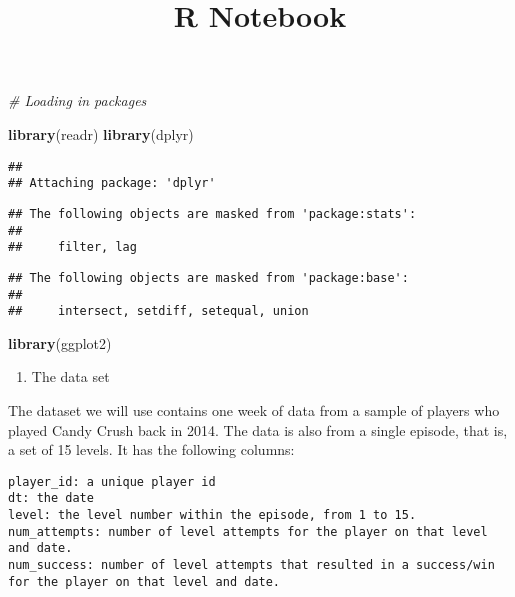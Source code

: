 \documentclass[
]{article}
\title{R Notebook}
\author{}
\date{\vspace{-2.5em}}
\newenvironment{Shaded}{\begin{snugshade}}{\end{snugshade}}
\newcommand{\CommentTok}[1]{\textcolor[rgb]{0.56,0.35,0.01}{\textit{#1}}}
\newcommand{\FunctionTok}[1]{\textcolor[rgb]{0.13,0.29,0.53}{\textbf{#1}}}
\newcommand{\NormalTok}[1]{#1}
\providecommand{\tightlist}{%
  \setlength{\itemsep}{0pt}\setlength{\parskip}{0pt}}
\begin{document}
\maketitle

\begin{Shaded}
\begin{Highlighting}[]
\CommentTok{\# Loading in packages}

\FunctionTok{library}\NormalTok{(readr)}
\FunctionTok{library}\NormalTok{(dplyr)}
\end{Highlighting}
\end{Shaded}

\begin{verbatim}
## 
## Attaching package: 'dplyr'
\end{verbatim}

\begin{verbatim}
## The following objects are masked from 'package:stats':
## 
##     filter, lag
\end{verbatim}

\begin{verbatim}
## The following objects are masked from 'package:base':
## 
##     intersect, setdiff, setequal, union
\end{verbatim}

\begin{Shaded}
\begin{Highlighting}[]
\FunctionTok{library}\NormalTok{(ggplot2)}
\end{Highlighting}
\end{Shaded}

\begin{enumerate}
\def\labelenumi{\arabic{enumi}.}
\setcounter{enumi}{1}
\tightlist
\item
  The data set
\end{enumerate}

The dataset we will use contains one week of data from a sample of
players who played Candy Crush back in 2014. The data is also from a
single episode, that is, a set of 15 levels. It has the following
columns:

\begin{verbatim}
player_id: a unique player id
dt: the date
level: the level number within the episode, from 1 to 15.
num_attempts: number of level attempts for the player on that level and date.
num_success: number of level attempts that resulted in a success/win for the player on that level and date.
\end{verbatim}
\end{document}
